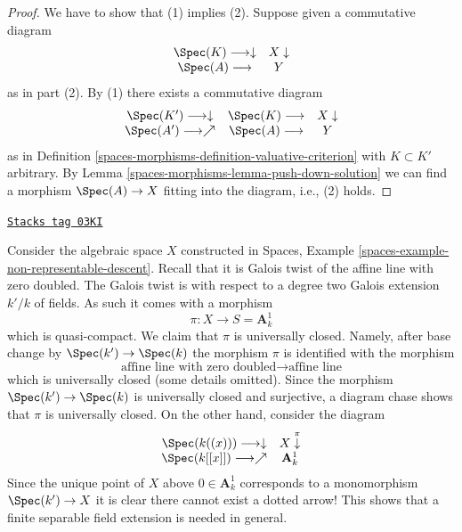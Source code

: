 \begin{proof}
We have to show that (1) implies (2). Suppose given a commutative diagram
$$
\begin{array}{cc}\Spec(K) \longrightarrow\downarrow & X \downarrow \\ \Spec(A) \longrightarrow & Y\end{array}
$$
as in part (2). By (1) there exists a commutative diagram
$$
\begin{array}{ccc}\Spec(K') \longrightarrow\downarrow & \Spec(K) \longrightarrow & X \downarrow \\ \Spec(A') \longrightarrow\nearrow & \Spec(A) \longrightarrow & Y\end{array}
$$
as in Definition \ref{spaces-morphisms-definition-valuative-criterion} with $K \subset K'$
arbitrary. By Lemma \ref{spaces-morphisms-lemma-push-down-solution} we can find a morphism
$\Spec(A) \to X$ fitting into the diagram, i.e., (2) holds.
\end{proof}

\begin{example}
\label{spaces-morphisms-example-finite-separable-needed}
\href{https://stacks.math.columbia.edu/tag/03KI}{\texttt{Stacks tag 03KI}}

Consider the algebraic space $X$ constructed in
Spaces, Example \ref{spaces-example-non-representable-descent}.
Recall that it is Galois twist of the affine line with zero doubled.
The Galois twist is with respect to a degree two Galois extension
$k'/k$ of fields. As such it comes with a morphism
$$
\pi : X \longrightarrow S = \mathbf{A}^1_k
$$
which is quasi-compact. We claim that $\pi$ is universally closed.
Namely, after base change by $\Spec(k') \to \Spec(k)$
the morphism $\pi$ is identified with the morphism
$$
\text{affine line with zero doubled}
\longrightarrow
\text{affine line}
$$
which is universally closed (some details omitted). Since the morphism
$\Spec(k') \to \Spec(k)$ is universally closed and
surjective, a diagram chase shows that $\pi$ is universally closed.
On the other hand, consider the diagram
$$
\begin{array}{cc}\Spec(k((x))) \longrightarrow\downarrow & X \overset{\pi}{\downarrow} \\ \Spec(k[[x]]) \longrightarrow\nearrow & \mathbf{A}^1_k\end{array}
$$
Since the unique point of $X$ above $0 \in \mathbf{A}^1_k$
corresponds to a monomorphism $\Spec(k') \to X$
it is clear there cannot exist a dotted arrow! This shows that
a finite separable field extension is needed in general.
\end{example}

